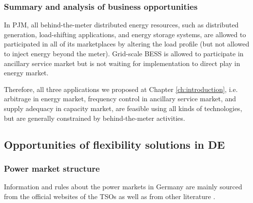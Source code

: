 

\subsubsection{Summary and analysis of business opportunities}
In PJM, all behind-the-meter distributed energy resources, such as distributed generation, load-shifting applications, and energy storage systems, are allowed to participated in all of its marketplaces by altering the load profile (but not allowed to inject energy beyond the meter). Grid-scale BESS is allowed to participate in ancillary service market but is not waiting for implementation to direct play in energy market. 

Therefore, all three applications we proposed at Chapter \ref{ch:introduction}, i.e. arbitrage in energy market, frequency control in ancillary service market, and supply adequacy in capacity market,  are feasible using all kinds of technologies, but are generally constrained by behind-the-meter activities. 

\subsection{Opportunities of flexibility solutions in DE}
\label{sec:quali-de}
\subsubsection{Power market structure}

Information and rules about the power markets in Germany are mainly sourced from the official websites of the TSOs \cite{Hertz_web,Amprion_web,TenneT_web,TransnetBW_web,DE_as_web} as well as from other literature \cite{Moller2010,ConsentecGmbH2014,Wartsila2014}.

